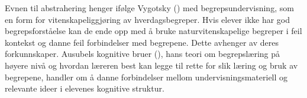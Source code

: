 \documentclass[main.tex]{subfiles}
\begin{document}
Evnen til abstrahering henger ifølge Vygotsky () med begrepsundervisning, som en
form for vitenskapeliggjøring av hverdagsbegreper. Hvis elever ikke har god begrepsforståelse
kan de ende opp med å bruke naturvitenskapelige begreper i feil kontekst og danne feil 
forbindelser med begrepene. Dette avhenger av deres forkunnskaper. Ausubels kognitive bruer 
(), hans teori om begrepslæring på høyere nivå og hvordan læreren best kan 
legge til rette for slik læring og bruk av begrepene,  handler om å danne forbindelser mellom 
undervisningsmateriell og relevante ideer i elevenes kognitive struktur.
\end{document}
